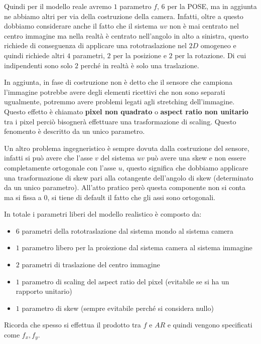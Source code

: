 Quindi per il modello reale avremo $1$ parametro $f$, $6$ per la POSE, ma in aggiunta
ne abbiamo altri per via della costruzione della camera. Infatti, oltre a questo 
dobbiamo considerare anche il fatto che il sistema $uv$ non è mai centrato nel 
centro immagine ma nella realtà è centrato nell'angolo in alto a sinistra, questo 
richiede di conseguenza di applicare una rototraslazione nel $2D$ omogeneo e quindi 
richiede altri $4$ parametri, $2$ per la posizione e $2$ per la rotazione. Di cui 
indipendenti sono solo $2$ perché in realtà è solo una traslazione. 

In aggiunta, in fase di costruzione non è detto che il sensore che campiona l'immagine 
potrebbe avere degli elementi ricettivi che non sono separati ugualmente, potremmo 
avere problemi legati agli stretching dell'immagine. Questo effetto è chiamato 
\textbf{pixel non quadrato} o \textbf{aspect ratio non unitario} tra i pixel perciò
bisognerà effettuare una trasformazione di scaling. Questo fenomento è descritto 
da un unico parametro.

Un altro problema ingegneristico è sempre dovuta dalla costruzione del sensore, 
infatti si può avere che l'asse $v$ del sistema $uv$ può avere una skew e non essere 
completamente ortogonale con l'asse $u$, questo significa che dobbiamo applicare 
una trasformazione di skew pari alla cotangente dell'angolo di skew (determinato 
da un unico parametro). All'atto pratico 
però questa componente non si conta ma si fissa a $0$, si tiene di default il fatto 
che gli assi sono ortogonali.

In totale i parametri liberi del modello realistico è composto da:
\begin{itemize}
    \item $6$ parametri della rototraslazione dal sistema mondo al sistema camera
    \item $1$ parametro libero per la proiezione dal sistema camera al sistema immagine
    \item $2$ parametri di traslazione del centro immagine
    \item $1$ parametro di scaling del aspect ratio del pixel (evitabile se si ha un 
    rapporto unitario)
    \item $1$ parametro di skew (sempre evitabile perché si considera nullo)
\end{itemize}

\begin{nota}
    Ricorda che spesso si effettua il prodotto tra $f$ e $AR$ e quindi vengono 
    specificati come $f_x,f_y$.
\end{nota}

